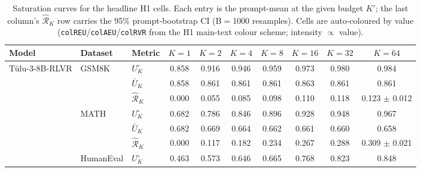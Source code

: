 \begin{table}[t]
\centering
\small
\setlength{\tabcolsep}{4pt}
\caption{Saturation curves for the headline H1 cells. Each entry is the prompt-mean at the given budget $K'$; the last column's $\hat{\mathcal R}_K$ row carries the 95\% prompt-bootstrap CI (B$=$1000 resamples). Cells are auto-coloured by value (\texttt{colREU}/\texttt{colAEU}/\texttt{colRVR} from the H1 main-text colour scheme; intensity $\propto$ value).}
\label{tab:appendix_saturation}
\begin{tabular}{lll *{7}{c}}
\toprule
Model & Dataset & Metric & $K{=}1$ & $K{=}2$ & $K{=}4$ & $K{=}8$ & $K{=}16$ & $K{=}32$ & $K{=}64$ \\
\midrule
\multirow{9}{*}{Tülu-3-8B-RLVR} & \multirow{3}{*}{GSM8K} & $U^\circ_K$ & \cellcolor{colREU!51}0.858 & \cellcolor{colREU!55}0.916 & \cellcolor{colREU!57}0.946 & \cellcolor{colREU!58}0.959 & \cellcolor{colREU!58}0.973 & \cellcolor{colREU!59}0.980 & \cellcolor{colREU!59}0.984 \\
 &  & $\bar U_K$ & \cellcolor{colAEU!51}0.858 & \cellcolor{colAEU!52}0.861 & \cellcolor{colAEU!52}0.861 & \cellcolor{colAEU!52}0.861 & \cellcolor{colAEU!52}0.863 & \cellcolor{colAEU!52}0.861 & \cellcolor{colAEU!52}0.861 \\
 &  & $\hat{\mathcal R}_K$ & \cellcolor{colRVR!0}0.000 & \cellcolor{colRVR!3}0.055 & \cellcolor{colRVR!5}0.085 & \cellcolor{colRVR!6}0.098 & \cellcolor{colRVR!7}0.110 & \cellcolor{colRVR!7}0.118 & \cellcolor{colRVR!7}0.123 $\pm$ 0.012 \\
\cmidrule(l){2-10}
 & \multirow{3}{*}{MATH} & $U^\circ_K$ & \cellcolor{colREU!41}0.682 & \cellcolor{colREU!47}0.786 & \cellcolor{colREU!51}0.846 & \cellcolor{colREU!54}0.896 & \cellcolor{colREU!56}0.928 & \cellcolor{colREU!57}0.948 & \cellcolor{colREU!58}0.967 \\
 &  & $\bar U_K$ & \cellcolor{colAEU!41}0.682 & \cellcolor{colAEU!40}0.669 & \cellcolor{colAEU!40}0.664 & \cellcolor{colAEU!40}0.662 & \cellcolor{colAEU!40}0.661 & \cellcolor{colAEU!40}0.660 & \cellcolor{colAEU!39}0.658 \\
 &  & $\hat{\mathcal R}_K$ & \cellcolor{colRVR!0}0.000 & \cellcolor{colRVR!7}0.117 & \cellcolor{colRVR!11}0.182 & \cellcolor{colRVR!14}0.234 & \cellcolor{colRVR!16}0.267 & \cellcolor{colRVR!17}0.288 & \cellcolor{colRVR!19}0.309 $\pm$ 0.021 \\
\cmidrule(l){2-10}
 & \multirow{3}{*}{HumanEval} & $U^\circ_K$ & \cellcolor{colREU!28}0.463 & \cellcolor{colREU!34}0.573 & \cellcolor{colREU!39}0.646 & \cellcolor{colREU!40}0.665 & \cellcolor{colREU!46}0.768 & \cellcolor{colREU!49}0.823 & \cellcolor{colREU!51}0.848 \\

\end{tabular}
\end{table}
